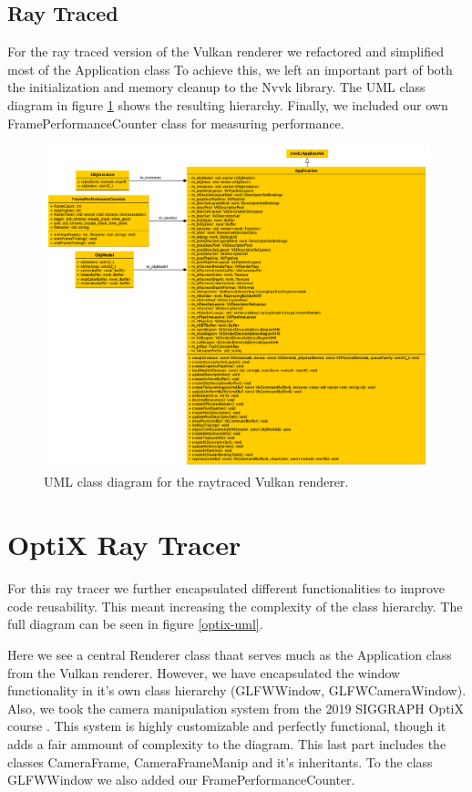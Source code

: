 \subsection{Ray Traced}
For the ray traced version of the Vulkan renderer we refactored and simplified most of the Application class To achieve this, we left an important part of both the initialization and memory cleanup to the Nvvk library. The UML class diagram in figure \ref{vulkan-rt-uml} shows the resulting hierarchy. Finally, we included our own FramePerformanceCounter class for measuring performance.

\begin{figure}[hbt!]
  \centering
  \includegraphics[width=\textwidth]{figuras/vulkan-rt-uml.png}
  \caption{UML class diagram for the raytraced Vulkan renderer.}
  \label{vulkan-rt-uml}
\end{figure}

\section{OptiX Ray Tracer}
For this ray tracer we further encapsulated different functionalities to improve code reusability. This meant increasing the complexity of the class hierarchy. The full diagram can be seen in figure \ref{optix-uml}. 

Here we see a central Renderer class thaat serves much as the Application class from the Vulkan renderer. However, we have encapsulated the window functionality in it's own class hierarchy (GLFWWindow, GLFWCameraWindow). Also, we took the camera manipulation system from the 2019 SIGGRAPH OptiX course \cite{OptixCourse}. This system is highly customizable and perfectly functional, though it adds a fair ammount of complexity to the diagram. This last part includes the classes CameraFrame, CameraFrameManip and it's inheritants. To the class GLFWWindow we also added our FramePerformanceCounter.

